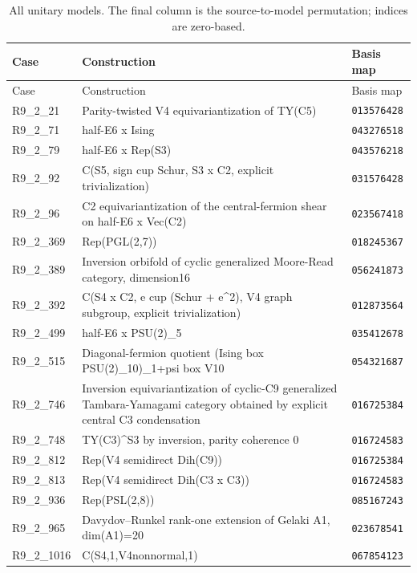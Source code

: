 \begin{small}\setlength{\tabcolsep}{4pt}\begin{longtable}{p{}p{}p{}}
\caption{All unitary models. The final column is the source-to-model permutation; indices are zero-based.}\label{tab:models}\\
\toprule Case & Construction & Basis map\\\midrule\endfirsthead\toprule Case & Construction & Basis map\\\midrule\endhead
R9\_2\_21 & Parity-twisted V4 equivariantization of TY(C5) & \texttt{013576428}\\
R9\_2\_71 & half-E6 x Ising & \texttt{043276518}\\
R9\_2\_79 & half-E6 x Rep(S3) & \texttt{043576218}\\
R9\_2\_92 & C(S5, sign cup Schur, S3 x C2, explicit trivialization) & \texttt{031576428}\\
R9\_2\_96 & C2 equivariantization of the central-fermion shear on half-E6 x Vec(C2) & \texttt{023567418}\\
R9\_2\_369 & Rep(PGL(2,7)) & \texttt{018245367}\\
R9\_2\_389 & Inversion orbifold of cyclic generalized Moore-Read category, dimension16 & \texttt{056241873}\\
R9\_2\_392 & C(S4 x C2, e cup (Schur + e\textasciicircum{}2), V4 graph subgroup, explicit trivialization) & \texttt{012873564}\\
R9\_2\_499 & half-E6 x PSU(2)\_5 & \texttt{035412678}\\
R9\_2\_515 & Diagonal-fermion quotient (Ising box PSU(2)\_10)\_{1+psi box V10} & \texttt{054321687}\\
R9\_2\_746 & Inversion equivariantization of cyclic-C9 generalized Tambara-Yamagami category obtained by explicit central C3 condensation & \texttt{016725384}\\
R9\_2\_748 & TY(C3)\textasciicircum{}S3 by inversion, parity coherence 0 & \texttt{016724583}\\
R9\_2\_812 & Rep(V4 semidirect Dih(C9)) & \texttt{016725384}\\
R9\_2\_813 & Rep(V4 semidirect Dih(C3 x C3)) & \texttt{016724583}\\
R9\_2\_936 & Rep(PSL(2,8)) & \texttt{085167243}\\
R9\_2\_965 & Davydov--Runkel rank-one extension of Gelaki A1, dim(A1)=20 & \texttt{023678541}\\
R9\_2\_1016 & C(S4,1,V4nonnormal,1) & \texttt{067854123}\\

\end{longtable}
\end{small}
